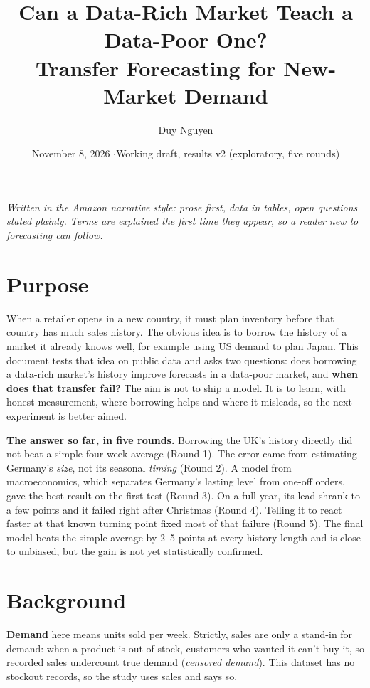 \documentclass[11pt]{article}
\title{Can a Data-Rich Market Teach a Data-Poor One?\\[0.3em]
\large Transfer Forecasting for New-Market Demand}
\author{Duy Nguyen}
\date{November 8, 2026 \quad$\cdot$\quad Working draft, results v2 (exploratory, five rounds)}
\begin{document}
\maketitle

\begin{center}
\begin{minipage}{0.9\textwidth}\small\itshape
Written in the Amazon narrative style: prose first, data in tables, open questions stated plainly.
Terms are explained the first time they appear, so a reader new to forecasting can follow.
\end{minipage}
\end{center}

\section{Purpose}

When a retailer opens in a new country, it must plan inventory before that country has much sales
history. The obvious idea is to borrow the history of a market it already knows well, for example using
US demand to plan Japan. This document tests that idea on public data and asks two questions: does
borrowing a data-rich market's history improve forecasts in a data-poor market, and \textbf{when does
that transfer fail?} The aim is not to ship a model. It is to learn, with honest measurement, where
borrowing helps and where it misleads, so the next experiment is better aimed.

\textbf{The answer so far, in five rounds.} Borrowing the UK's history directly did not beat a simple
four-week average (Round 1). The error came from estimating Germany's \emph{size}, not its seasonal
\emph{timing} (Round 2). A model from macroeconomics, which separates Germany's lasting level from one-off
orders, gave the best result on the first test (Round 3). On a full year, its lead shrank to a few points and
it failed right after Christmas (Round 4). Telling it to react faster at that known turning point fixed most
of that failure (Round 5). The final model beats the simple average by 2--5 points at every history length
and is close to unbiased, but the gain is not yet statistically confirmed.

\section{Background}

\textbf{Demand} here means units sold per week. Strictly, sales are only a stand-in for demand: when a
product is out of stock, customers who wanted it can't buy it, so recorded sales undercount true demand
(\emph{censored demand}). This dataset has no stockout records, so the study uses sales and says so.
\end{document}
